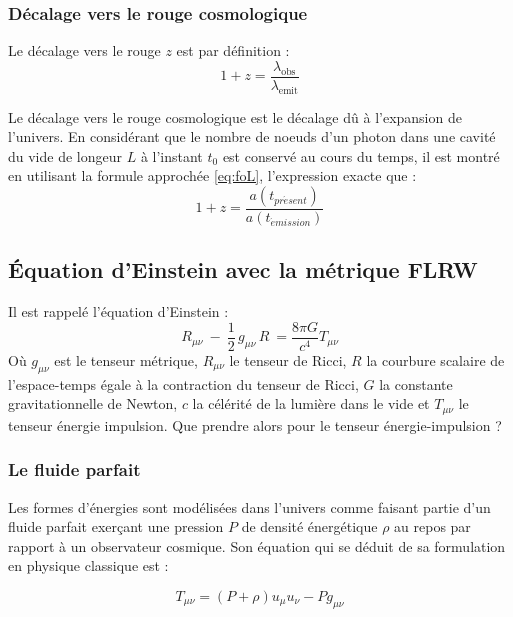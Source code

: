 \documentclass[10pt, a4paper]{report}
\numberwithin{equation}{subsection}
\begin{document}
\subsubsection{Décalage vers le rouge cosmologique}
Le décalage vers le rouge $z$ est par définition : 
\begin{equation}
\boxed{1+z = \frac{\lambda_{\mathrm{obs}}}{\lambda_{\mathrm{emit}}}}
\end{equation}

Le décalage vers le rouge cosmologique est le décalage dû à l'expansion de l'univers. En considérant que le nombre de noeuds d'un photon dans une cavité du vide de longeur $L$ à l'instant $t_0$ est conservé au cours du temps, il est montré en utilisant la formule approchée \ref{eq:foL}, l'expression exacte que :
\begin{equation} \label{eq:zC}
\boxed{1+z = \frac{a(t_{pr\acute esent})}{a(t_{\acute emission})}}
\end{equation}

\subsection{\uppercase{é}quation d'Einstein avec la métrique FLRW}
Il est rappelé l'équation d'Einstein :
\begin{equation} \label{eq:EFE}
\boxed{R_{\mu \nu} \ - \ \frac{1}{2} \, g_{\mu \nu} \, R  \  =  \frac{8 \pi G}{c^4} T_{\mu \nu}}
\end{equation}
Où $g_{\mu \nu}$ est le tenseur métrique, $R_{\mu \nu}$ le tenseur de Ricci, $R$ la courbure scalaire de l'espace-temps égale à la contraction du tenseur de Ricci,  $G$ la constante gravitationnelle de Newton, $c$ la célérité de la lumière dans le vide et $T_{\mu \nu}$ le tenseur énergie impulsion.
Que prendre alors pour le tenseur énergie-impulsion ?
\subsubsection{Le fluide parfait}
Les formes d'énergies sont modélisées dans l'univers comme faisant partie d'un fluide parfait exerçant une pression $P$ de densité énergétique $\rho$ au repos par rapport à un observateur cosmique. Son équation qui se déduit de sa formulation en physique classique est : 

\begin{equation} \label{eq:FP}
\boxed{T_{\mu\nu} = (P + \rho) u_\mu u_\nu - P g_{\mu\nu}}
\end{equation}
\end{document}
